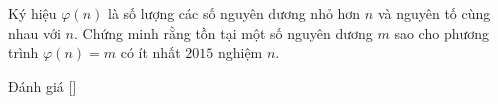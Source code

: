 \ifshowproblem
\begin{problem}\label{problem:USA-2015-TSTST-P5}
    Ký hiệu \( \varphi(n) \) là số lượng các số nguyên dương nhỏ hơn \( n \) và nguyên tố cùng nhau với \( n \).  
    Chứng minh rằng tồn tại một số nguyên dương \( m \) sao cho phương trình \( \varphi(n) = m \) có ít nhất \( 2015 \) nghiệm \( n \).
\end{problem}
\fi

\ifshowinfo
Đánh giá [\textbf{}]\footnotemark
{}
\fi
